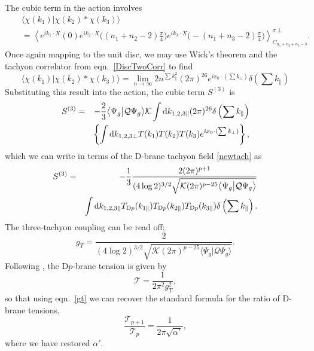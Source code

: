 \documentclass[letterpaper,12pt]{article}
\def\Pcm#1{{\mathcal{#1}}}
\def\nn{\nonumber}
\def\er#1{eqn.~\eqref{#1}}
\newcommand{\Dp}{\textup{D}p}
\newcommand{\td}{\textup{d}}
\begin{document}
The cubic term in the action involves
\begin{eqnarray}
\label{chichichi}
 && \big\langle\chi(k_1)\big|\chi(k_2) * \chi(k_3)\big\rangle \nn\\
 && = \left\langle e^{ik_1\cdot X}(0)
                e^{ik_2\cdot X}\big((n_1+n_2-2)\frac\pi4\big)
                e^{ik_3\cdot X}\big(-(n_1+n_3-2)\frac\pi4\big)
\right\rangle^{\sigma\perp}_{C_{n_1+n_2+n_3-3}}
.\end{eqnarray}
Once again mapping to the unit disc, we may use Wick's theorem and the tachyon
correlator from \er{DiscTwoCorr} to find
\begin{equation}
\big\langle\chi(k_1)\big|\chi(k_2) * \chi(k_3)\big\rangle = \lim_{n\rightarrow \infty}
   2n^{\sum k_\parallel^2} 
   (2\pi)^{26}
   e^{ix_0\cdot(\sum k_\perp)} 
   \delta\left(\sum k_\parallel\right) 
\end{equation}
Substituting this result into the action, the cubic term $S^{(3)}$ is
\begin{eqnarray}
S^{(3)}&=&-\frac23 \big\langle\Psi_g\big|\Pcm{Q}\Psi_g\big\rangle \Pcm{K} 
    \int \td k_{1,2,3\parallel}
    (2\pi)^{26}
    \delta\left(\sum k_\parallel\right)
   \nn\\
   &&  \left\{
    \int \td k_{1,2,3 \perp}
    T(k_1)T(k_2)T(k_3)
    e^{ix_0\cdot(\sum k_\perp)}
    \right\}
,\end{eqnarray}
which we can write in terms of the D-brane tachyon field \eqref{newtach} as
\begin{eqnarray}
S^{(3)}&=&-\frac13 
     \frac{2(2\pi)^{p+1}}{(4\log 2)^{3/2}\sqrt{\Pcm{K}
        (2\pi)^{p-25}
        \big\langle\Psi_g\big|\Pcm{Q}\Psi_g\big\rangle}} \nn\\
    && \int \td k_{1,2,3 \parallel}
      T_{\Dp}(k_{1\parallel})
      T_{\Dp}(k_{2\parallel})
      T_{\Dp}(k_{3\parallel})
     \delta\left(\sum k_\parallel\right) 
.\end{eqnarray}
The three-tachyon coupling can be read off;
\begin{equation}
\label{gt}
g_T=\frac2{(4\log 2)^{3/2}\sqrt{\Pcm{K} (2\pi)^{p-25}
    \big\langle\Psi_g\big|\Pcm{Q}\Psi_g\big\rangle}}
.\end{equation}
Following \cite{Sen2}, the D$p$-brane tension is given by
\begin{equation}
\Pcm{T}=\frac1{2\pi^2g_T^2}
,\end{equation}
so that using \er{gt} we can recover the standard formula for the ratio of D-brane tensions,
\begin{equation}
\label{tensions}
\frac{\Pcm{T}_{p+1}}{\Pcm{T}_p}=\frac1{2\pi\sqrt{\alpha'}}
,\end{equation}
where we have restored $\alpha'$.
 
\end{document}
